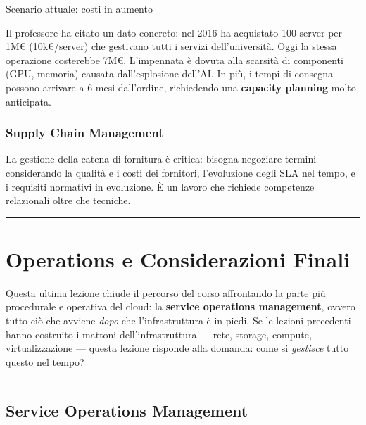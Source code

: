 \documentclass[
  italian,
  openany]{book}
\begin{document}
\begin{calloutwarning}{Scenario attuale: costi in aumento}

Il professore ha citato un dato concreto: nel 2016 ha acquistato 100
server per 1M€ (10k€/server) che gestivano tutti i servizi
dell'università. Oggi la stessa operazione costerebbe 7M€. L'impennata è
dovuta alla scarsità di componenti (GPU, memoria) causata
dall'esplosione dell'AI. In più, i tempi di consegna possono arrivare a
6 mesi dall'ordine, richiedendo una \textbf{capacity planning} molto
anticipata.

\end{calloutwarning}

\subsection{Supply Chain Management}\label{supply-chain-management}

La gestione della catena di fornitura è critica: bisogna negoziare
termini considerando la qualità e i costi dei fornitori, l'evoluzione
degli SLA nel tempo, e i requisiti normativi in evoluzione. È un lavoro
che richiede competenze relazionali oltre che tecniche.

\begin{center}\rule{0.5\linewidth}{0.5pt}\end{center}

\newpage

\chapter{Operations e Considerazioni
Finali}\label{operations-e-considerazioni-finali}

Questa ultima lezione chiude il percorso del corso affrontando la parte
più procedurale e operativa del cloud: la \textbf{service operations
management}, ovvero tutto ciò che avviene \emph{dopo} che
l'infrastruttura è in piedi. Se le lezioni precedenti hanno costruito i
mattoni dell'infrastruttura --- rete, storage, compute, virtualizzazione
--- questa lezione risponde alla domanda: come si \emph{gestisce} tutto
questo nel tempo?

\begin{center}\rule{0.5\linewidth}{0.5pt}\end{center}

\section{Service Operations
Management}\label{service-operations-management}
\end{document}

